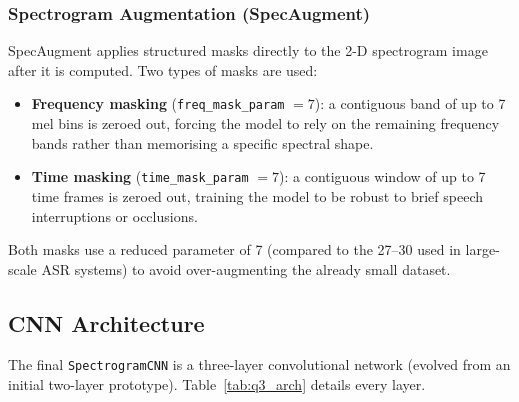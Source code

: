 \documentclass[12pt, a4paper]{article}
\begin{document}
\subsubsection{Spectrogram Augmentation (SpecAugment)}

SpecAugment applies structured masks directly to the 2-D spectrogram image after it is
computed. Two types of masks are used:
\begin{itemize}
    \item \textbf{Frequency masking} (\texttt{freq\_mask\_param} $= 7$): a contiguous
          band of up to 7 mel bins is zeroed out, forcing the model to rely on the
          remaining frequency bands rather than memorising a specific spectral shape.
    \item \textbf{Time masking} (\texttt{time\_mask\_param} $= 7$): a contiguous window
          of up to 7 time frames is zeroed out, training the model to be robust to brief
          speech interruptions or occlusions.
\end{itemize}

Both masks use a reduced parameter of 7 (compared to the 27--30 used in large-scale
ASR systems) to avoid over-augmenting the already small dataset.

\subsection{CNN Architecture}

The final \texttt{SpectrogramCNN} is a three-layer convolutional network (evolved from
an initial two-layer prototype). Table~\ref{tab:q3_arch} details every layer.
\end{document}
